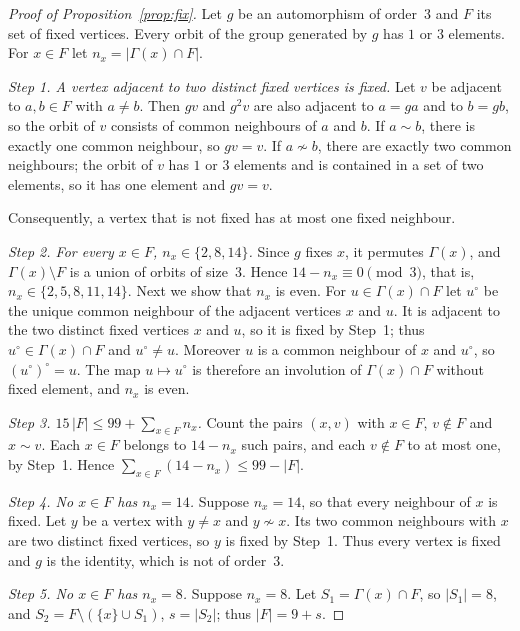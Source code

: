 \documentclass[11pt,a4paper]{article}
\theoremstyle{remark}
\begin{document}
\begin{proof}[Proof of Proposition~\ref{prop:fix}]
Let $g$ be an automorphism of order~3 and $F$ its set of fixed vertices. Every orbit of the group generated by $g$
has $1$ or $3$ elements. For $x\in F$ let $n_x=|\Gamma(x)\cap F|$.

\medskip\noindent\emph{Step 1. A vertex adjacent to two distinct fixed vertices is fixed.}
Let $v$ be adjacent to $a,b\in F$ with $a\ne b$. Then $gv$ and $g^2v$ are also adjacent to $a=ga$ and to $b=gb$, so
the orbit of $v$ consists of common neighbours of $a$ and $b$. If $a\sim b$, there is exactly one common neighbour,
so $gv=v$. If $a\not\sim b$, there are exactly two common neighbours; the orbit of $v$ has $1$ or $3$ elements and is
contained in a set of two elements, so it has one element and $gv=v$.

Consequently, a vertex that is not fixed has at most one fixed neighbour.

\medskip\noindent\emph{Step 2. For every $x\in F$, $n_x\in\{2,8,14\}$.}
Since $g$ fixes $x$, it permutes $\Gamma(x)$, and $\Gamma(x)\setminus F$ is a union of orbits of size~3. Hence
$14-n_x\equiv0\pmod 3$, that is, $n_x\in\{2,5,8,11,14\}$. Next we show that $n_x$ is even. For $u\in\Gamma(x)\cap F$
let $u^\circ$ be the unique common neighbour of the adjacent vertices $x$ and $u$. It is adjacent to the two distinct
fixed vertices $x$ and $u$, so it is fixed by Step~1; thus $u^\circ\in\Gamma(x)\cap F$ and $u^\circ\ne u$. Moreover
$u$ is a common neighbour of $x$ and $u^\circ$, so $(u^\circ)^\circ=u$. The map $u\mapsto u^\circ$ is therefore an
involution of $\Gamma(x)\cap F$ without fixed element, and $n_x$ is even.

\medskip\noindent\emph{Step 3. $15\,|F|\le 99+\sum_{x\in F}n_x$.}
Count the pairs $(x,v)$ with $x\in F$, $v\notin F$ and $x\sim v$. Each $x\in F$ belongs to $14-n_x$ such pairs, and
each $v\notin F$ to at most one, by Step~1. Hence $\sum_{x\in F}(14-n_x)\le 99-|F|$.

\medskip\noindent\emph{Step 4. No $x\in F$ has $n_x=14$.}
Suppose $n_x=14$, so that every neighbour of $x$ is fixed. Let $y$ be a vertex with $y\ne x$ and $y\not\sim x$. Its
two common neighbours with $x$ are two distinct fixed vertices, so $y$ is fixed by Step~1. Thus every vertex is fixed
and $g$ is the identity, which is not of order~3.

\medskip\noindent\emph{Step 5. No $x\in F$ has $n_x=8$.}
Suppose $n_x=8$. Let $S_1=\Gamma(x)\cap F$, so $|S_1|=8$, and $S_2=F\setminus(\{x\}\cup S_1)$, $s=|S_2|$; thus
$|F|=9+s$.


\end{proof}
\end{document}
